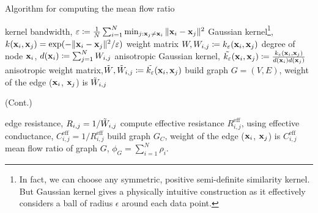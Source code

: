 \documentclass[xcolor={dvipsnames,svgnames}]{beamer}
\begin{document}
\begin{frame}{Algorithm for computing the mean flow ratio}
\begin{algorithm}[H]
\caption{Algorithm for computing the mean flow ratio.}\label{alg:mean-flow-ratio}
\DontPrintSemicolon
{}
kernel bandwidth, $\varepsilon \coloneqq \frac{1}{N}\sum_{i=1}^N \min_{j: \mathbf{x}_j \neq \mathbf{x}_i}\|\mathbf{x}_i - \mathbf{x}_j\|^2$\;
Gaussian kernel\footnote{In fact, we can choose any symmetric, positive semi-definite similarity kernel. But Gaussian kernel gives a physically intuitive construction as it effectively considers a ball of radius $\epsilon$ around each data point.}, $k(\mathbf{x}_i, \mathbf{x}_j) = \exp(-\|\mathbf{x}_i - \mathbf{x}_j\|^2/\varepsilon)$ \;
weight matrix $W, W_{i, j}\coloneqq {k_\varepsilon}(\mathbf{x}_i, \mathbf{x}_j)$\;
degree of node $\mathbf{x}_i$, $d(\mathbf{x}_i) \coloneqq \sum_{j=1}^N W_{i,j}$\;
anisotropic Gaussian kernel, $\Tilde{k_\varepsilon}(\mathbf{x}_i, \mathbf{x}_j) \coloneqq \frac{k_\varepsilon(\mathbf{x}_i, \mathbf{x}_j)}{d(\mathbf{x}_i)d(\mathbf{x}_j)}$ \;
anisotropic weight matrix,$\Tilde{W}, \Tilde{W}_{i, j}\coloneqq \Tilde{k_\varepsilon}(\mathbf{x}_i, \mathbf{x}_j)$\;
build graph $G = (V, E)$, weight of the edge ($\mathbf{x}_i$, $\mathbf{x}_j$) is $\Tilde{W}_{i, j}$ \;
\end{algorithm}
\end{frame}

\begin{frame}{(Cont.)}
\begin{algorithm}[H]
\caption{Algorithm for computing the mean flow ratio (cont.).}\label{alg:mean-flow-ratio-cont}
\DontPrintSemicolon
edge resistance, $R_{i, j} = 1/\Tilde{W}_{i, j}$ \;
compute effective resistance $R^{\text{eff}}_{i, j}$, using \cite{effective-resistance}\;
effective conductance, $C^{\text{eff}}_{i, j} = 1/R^{\text{eff}}_{i, j}$\;
build graph $G_C$, weight of the edge ($\mathbf{x}_i$, $\mathbf{x}_j$) is $C^{\text{eff}}_{i, j}$  \;
mean flow ratio of graph $G$, $\phi_G = \sum_{i=1}^N \rho_i.$
\end{algorithm}
\end{frame}
\end{document}
